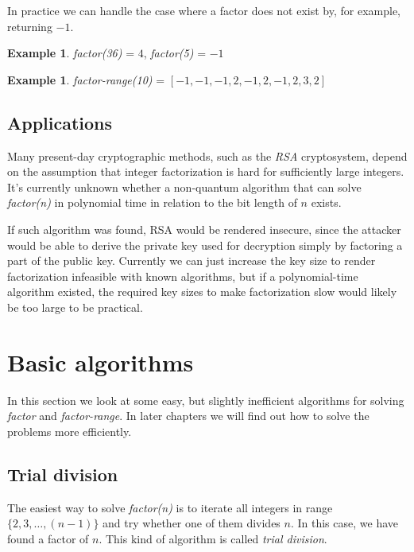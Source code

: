 \documentclass[12pt] {article}
\theoremstyle{plain}
\theoremstyle{definition}
\newtheorem{exmp}[thm]{Example}
\begin{document}
In practice we can handle the case where a factor does not exist by, for example, returning $-1$.

\begin{exmp}
\textit{factor(36)} = $4$, \textit{factor(5)} = $-1$
\end{exmp}

\begin{exmp}
\textit{factor-range(10)} = $[-1, -1, -1, 2, -1, 2, -1, 2, 3, 2]$
\end{exmp}

\subsection {Applications}

Many present-day cryptographic methods, such as the \textit{RSA} cryptosystem, depend on the assumption that integer factorization is hard for sufficiently large integers. It's currently unknown whether a non-quantum algorithm that can solve \textit{factor(n)} in polynomial time in relation to the bit length of $n$ exists\cite{stein}.

If such algorithm was found, RSA would be rendered insecure, since the attacker would be able to derive the private key used for decryption simply by factoring a part of the public key. Currently we can just increase the key size to render factorization infeasible with known algorithms, but if a polynomial-time algorithm existed, the required key sizes to make factorization slow would likely be too large to be practical.

\section {Basic algorithms}

In this section we look at some easy, but slightly inefficient algorithms for solving \textit{factor} and \textit{factor-range}. In later chapters we will find out how to solve the problems more efficiently.

\subsection {Trial division}

The easiest way to solve \textit{factor(n)} is to iterate all integers in range $\{2, 3, \dots, (n-1)\}$ and try whether one of them divides $n$. In this case, we have found a factor of $n$. This kind of algorithm is called \textit{trial division}. 
\end{document}
